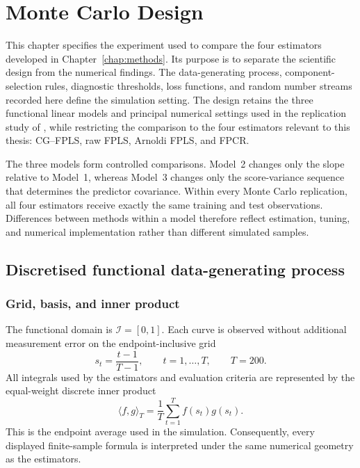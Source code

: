 \chapter{Monte Carlo Design}
\label{chap:simulation-design}

This chapter specifies the experiment used to compare the four estimators
developed in Chapter~\ref{chap:methods}.  Its purpose is to separate the
scientific design from the numerical findings.  The data-generating process,
component-selection rules, diagnostic thresholds, loss functions, and random
number streams recorded here define the simulation setting.  The design retains
the three functional linear models and principal numerical settings used in
the replication study of \textcite{babii_carrasco_tsafack_2026}, while
restricting the comparison to the four estimators relevant to this thesis:
CG--FPLS, raw FPLS, Arnoldi FPLS, and FPCR.

The three models form controlled comparisons.  Model~2 changes only the slope
relative to Model~1, whereas Model~3 changes only the score-variance sequence
that determines the predictor covariance.
Within every Monte Carlo replication, all four estimators receive exactly the
same training and test observations.  Differences between methods within a
model therefore reflect estimation, tuning, and numerical implementation
rather than different simulated samples.

\section{Discretised functional data-generating process}
\label{sec:simulation-dgp}

\subsection{Grid, basis, and inner product}

The functional domain is $\mathcal I=[0,1]$.  Each curve is observed without
additional measurement error on the endpoint-inclusive grid
\begin{equation}
    s_t=\frac{t-1}{T-1},
    \qquad t=1,\ldots,T,
    \qquad T=200.
    \label{eq:simulation-grid}
\end{equation}
All integrals used by the estimators and evaluation criteria are represented
by the equal-weight discrete inner product
\begin{equation}
    \langle f,g\rangle_T
    =\frac1T\sum_{t=1}^{T}f(s_t)g(s_t).
    \label{eq:simulation-inner-product}
\end{equation}
This is the endpoint average used in the simulation.
Consequently, every displayed finite-sample formula is interpreted under the
same numerical geometry as the estimators.

